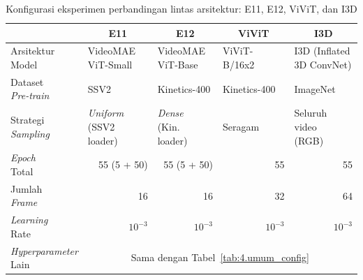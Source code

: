 \begin{table}[H]
\centering
\caption{Konfigurasi eksperimen perbandingan lintas arsitektur: E11, E12, ViViT, dan I3D}
\label{tab:4.s6_config}
{\setlength{\tabcolsep}{3pt}
\footnotesize
\begin{tabular}{|l|l|l|l|l|}
\hline
\rowcolor{gray!15} \multicolumn{1}{|c|}{\textbf{Parameter}} & \multicolumn{1}{c|}{\textbf{E11}} & \multicolumn{1}{c|}{\textbf{E12}} & \multicolumn{1}{c|}{\textbf{ViViT}} & \multicolumn{1}{c|}{\textbf{I3D}} \\
\hline
\makecell[l]{Arsitektur\\Model} & \makecell[l]{VideoMAE\\ViT-Small} & \makecell[l]{VideoMAE\\ViT-Base} & \multicolumn{1}{l|}{ViViT-B/16x2} & \makecell[l]{I3D (Inflated\\3D ConvNet)} \\
\hline
\makecell[l]{Dataset\\\textit{Pre-train}} & \multicolumn{1}{l|}{SSV2} & \multicolumn{1}{l|}{Kinetics-400} & \multicolumn{1}{l|}{Kinetics-400} & \multicolumn{1}{l|}{ImageNet} \\
\hline
\makecell[l]{Strategi\\\textit{Sampling}} & \makecell[l]{\textit{Uniform}\\(SSV2 loader)} & \makecell[l]{\textit{Dense}\\(Kin. loader)} & \multicolumn{1}{l|}{Seragam} & \makecell[l]{Seluruh video\\(RGB)} \\
\hline
\makecell[l]{\textit{Epoch}\\Total} & \multicolumn{1}{r|}{55 (5 + 50)} & \multicolumn{1}{r|}{55 (5 + 50)} & \multicolumn{1}{r|}{55} & \multicolumn{1}{r|}{55} \\
\hline
\makecell[l]{Jumlah\\\textit{Frame}} & \multicolumn{1}{r|}{16} & \multicolumn{1}{r|}{16} & \multicolumn{1}{r|}{32} & \multicolumn{1}{r|}{64} \\
\hline
\makecell[l]{\textit{Learning}\\Rate} & \multicolumn{1}{r|}{$10^{-3}$} & \multicolumn{1}{r|}{$10^{-3}$} & \multicolumn{1}{r|}{$10^{-3}$} & \multicolumn{1}{r|}{$10^{-3}$} \\
\hline
\makecell[l]{\textit{Hyperparameter}\\Lain} & \multicolumn{4}{c|}{Sama dengan Tabel~\ref{tab:4.umum_config}} \\
\hline
\end{tabular}
}
\end{table}


